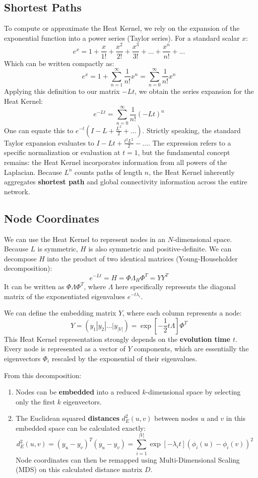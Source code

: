 \subsection{Shortest Paths}
To compute or approximate the Heat Kernel, we rely on the expansion of the exponential function into a power series (Taylor series). For a standard scalar \( x \):
\[
    e^x = 1 + \frac{x}{1!} + \frac{x^2}{2!} + \frac{x^3}{3!} + \dots + \frac{x^n}{n!} + \dots
\]
Which can be written compactly as:
\[
    e^x = 1 + \sum_{n=1}^{\infty} \frac{1}{n!} x^n = \sum_{n=0}^{\infty} \frac{1}{n!} x^n
\]
Applying this definition to our matrix \( -Lt \), we obtain the series expansion for the Heat Kernel:
\[
    e^{-Lt} = \sum_{n=0}^{\infty} \frac{1}{n!} (-Lt)^n
\]
One can equate this to \( e^{-t}(I - L + \frac{L^2}{2} + \dots) \). Strictly speaking, the standard Taylor expansion evaluates to \( I - Lt + \frac{t^2 L^2}{2} - \dots \). The expression refers to a specific normalization or evaluation at \( t=1 \), but the fundamental concept remains: the Heat Kernel incorporates information from all powers of the Laplacian. Because \( L^n \) counts paths of length \( n \), the Heat Kernel inherently aggregates \textbf{shortest path} and global connectivity information across the entire network.

\subsection{Node Coordinates}

We can use the Heat Kernel to represent nodes in an \( N \)-dimensional space. Because \( L \) is symmetric, \( H \) is also symmetric and positive-definite. We can decompose \( H \) into the product of two identical matrices (Young-Householder decomposition):
\[
    e^{-Lt} = H = \Phi \Lambda_H \Phi^T = Y Y^T
\]
It can be written as \( \Phi \Lambda \Phi^T \), where \( \Lambda \) here specifically represents the diagonal matrix of the exponentiated eigenvalues \( e^{-t\lambda_i} \).

We can define the embedding matrix \( Y \), where each column represents a node:
\[
    Y = (y_1 | y_2 | \dots | y_{|V|}) = \exp\left[-\frac{1}{2}t\Lambda\right] \Phi^T
\]
This Heat Kernel representation strongly depends on the \textbf{evolution time \( t \)}. Every node is represented as a vector of \( Y \) components, which are essentially the eigenvectors \( \Phi_i \) rescaled by the exponential of their eigenvalues.

From this decomposition:
\begin{enumerate}
    \item Nodes can be \textbf{embedded} into a reduced \( k \)-dimensional space by selecting only the first \( k \) eigenvectors.
    \item The Euclidean squared \textbf{distances} \( d_E^2(u,v) \) between nodes \( u \) and \( v \) in this embedded space can be calculated exactly:
          \[
              d_E^2(u, v) = (y_u - y_v)^T (y_u - y_v) = \sum_{i=1}^{|V|} \exp[-\lambda_i t] (\phi_i(u) - \phi_i(v))^2
          \]
          Node coordinates can then be remapped using Multi-Dimensional Scaling (MDS) on this calculated distance matrix \( D \).
\end{enumerate}

